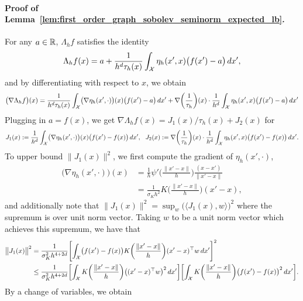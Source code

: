 \paragraph{Proof of Lemma~\ref{lem:first_order_graph_sobolev_seminorm_expected_lb}.}
For any $a \in \mathbb{R}$, $\Lambda_hf$ satisfies the identity
\begin{equation*}
\Lambda_hf(x) = a + \frac{1}{h^d\tau_h(x)}\int_{\mathcal{X}} \eta_h(x',x)\bigl(f(x') - a\bigr)\,dx',
\end{equation*}
and by differentiating with respect to $x$,  we obtain
\begin{equation*}
\bigl(\nabla \Lambda_hf\bigr)(x)= \frac{1}{h^d\tau_h(x)}\int_{\mathcal{X}} \bigl(\nabla \eta_h(x',\cdot)\bigr)(x)\bigl(f(x') - a\bigr)\,dx' + \nabla\biggl(\frac{1}{\tau_h}\biggr)(x)\cdot \frac{1}{h^d}\int_{\mathcal{X}} \eta_h(x',x)\bigl(f(x') - a\bigr)\,dx'
\end{equation*} 
Plugging in $a = f(x)$, we get $\nabla\Lambda_hf(x) = J_1(x)/\tau_h(x) + J_2(x)$ for
\begin{equation*}
J_1(x) := \frac{1}{h^d}\int_{\mathcal{X}} \bigl(\nabla \eta_h(x',\cdot)\bigr)(x)\bigl(f(x') - f(x)\bigr)\,dx',~~ J_2(x) := \nabla\biggl(\frac{1}{\tau_h}\biggr)(x)\cdot \frac{1}{h^d}\int_{\mathcal{X}} \eta_h(x',x)\bigl(f(x') - f(x)\bigr)\,dx'.
\end{equation*}
To upper bound $\bigl\|J_1(x)\bigr\|^2$, we first compute the gradient of $\eta_h(x',\cdot)$,
\begin{align*}
\bigl(\nabla\eta_h(x',\cdot)\bigr)(x) & = \frac{1}{h} \psi'\biggl(\frac{\|x'  - x\|}{h}\biggr) \frac{(x - x')}{\|x' - x\|} \\
& = \frac{1}{\sigma_Kh^{2}} K\biggl(\frac{\|x' - x\|}{h}\biggr) (x' - x),
\end{align*}
and additionally note that $\|J_1(x)\|^2 = \sup_{w}\bigl(\langle J_1(x), w \rangle\bigr)^2$ where the supremum is over unit norm vector. Taking $w$ to be a unit norm vector which achieves this supremum, we have that
\begin{align*}
\bigl\|J_1(x)\bigr\|^2 & = \frac{1}{\sigma_K^2 h^{4 + 2d}} \Biggl[\int_{\mathcal{X}} \bigl(f(x') - f(x)\bigr)K\biggl(\frac{\|x' - x\|}{h}\biggr)(x' - x)^{\top}w\,dx'\Biggr]^2 \\
& \leq \frac{1}{\sigma_K^2 h^{4 + 2d}} \biggl[\int_{\mathcal{X}}K\biggl(\frac{\|x' - x\|}{h}\biggr)\bigl((x' - x)^{\top} w\bigr)^2\,dx'\biggr] \biggl[\int_{\mathcal{X}}K\biggl(\frac{\|x' - x\|}{h}\biggr)\bigl(f(x') - f(x)\bigr)^2\,dx'\biggr].
\end{align*}
By a change of variables, we obtain
